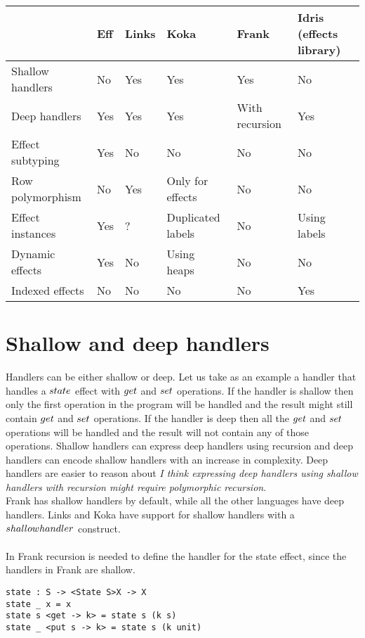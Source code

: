 \newpage
\hfill
\begin{adjustbox}{angle=90}
\begin{tabular}{ l | l | l | l | l | l }
			& Eff\cite{eff1}\cite{eff2}		& Links \cite{links} 	& Koka\cite{koka}	& Frank\cite{frank} 		& Idris (effects library)\cite{idris}	\\ \hline
Shallow handlers 	& No		& Yes 		& Yes 			& Yes 			& No 				\\ \hline
Deep handlers 	& Yes		& Yes 		& Yes 			& With recursion 	& Yes 				\\ \hline
Effect subtyping	& Yes		& No		& No			& No			& No	 			\\ \hline
Row polymorphism	& No		& Yes		& Only for effects 	& No			& No 				\\ \hline
Effect instances	& Yes		& ?		& Duplicated labels 	& No			& Using labels		\\ \hline
Dynamic effects	& Yes		& No		& Using heaps      	& No			& No 				\\ \hline
Indexed effects	& No		& No		& No			& No			& Yes 				\\
\end{tabular}
\end{adjustbox}
\hfill
\null

\newpage
\section{Shallow and deep handlers}
Handlers can be either shallow or deep. Let us take as an example a handler that handles a $\mathnormal{state}$ effect with $\mathnormal{get}$ and $\mathnormal{set}$ operations.
If the handler is shallow then only the first operation in the program will be handled and the result might still contain $\mathnormal{get}$ and $\mathnormal{set}$ operations.
If the handler is deep then all the  $\mathnormal{get}$ and $\mathnormal{set}$ operations will be handled and the result will not contain any of those operations.
Shallow handlers can express deep handlers using recursion and deep handlers can encode shallow handlers with an increase in complexity.
Deep handlers are easier to reason about \textit{I think expressing deep handlers using shallow handlers with recursion might require polymorphic recursion}. \\
Frank has shallow handlers by default, while all the other languages have deep handlers. Links and Koka have support for shallow handlers with a $\mathnormal{shallowhandler}$ construct.
\\\\
In Frank recursion is needed to define the handler for the state effect, since the handlers in Frank are shallow.
\begin{lstlisting}
state : S -> <State S>X -> X
state _ x = x
state s <get -> k> = state s (k s)
state _ <put s -> k> = state s (k unit)
\end{lstlisting}

